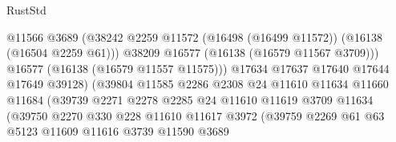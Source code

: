 \begin{lexlean}{RustStd}
\begin{coremodule}
                                          @11566
                                          @3689
                                          (@38242
                                            @2259
                                            @11572
                                            (@16498 (@16499 @11572))
                                            (@16138 (@16504 @2259 @61)))
                                          @38209
                                          @16577
                                          (@16138 (@16579 @11567 @3709)))
                                        @16577
                                        (@16138 (@16579 @11557 @11575)))
                                      @17634
                                      @17637
                                      @17640
                                      @17644
                                      @17649
                                      @39128)
                                    (@39804
                                      @11585
                                      @2286
                                      @2308
                                      @24
                                      @11610
                                      @11634
                                      @11660
                                      @11684
                                      (@39739
                                        @2271
                                        @2278
                                        @2285
                                        @24
                                        @11610
                                        @11619
                                        @3709
                                        @11634
                                        (@39750
                                          @2270
                                          @330
                                          @228
                                          @11610
                                          @11617
                                          @3972
                                          (@39759
                                            @2269
                                            @61
                                            @63
                                            @5123
                                            @11609
                                            @11616
                                            @3739
                                            @11590
                                            @3689

\end{coremodule}
\end{lexlean}
